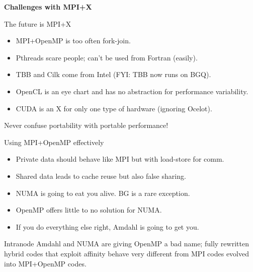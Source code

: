\begin{frame}{} \LARGE
  \begin{center}
      \textbf{Challenges with MPI+X}
  \end{center}
\end{frame}

\begin{frame}[fragile]{The future is MPI+X}
\begin{itemize}
	\item MPI+OpenMP is too often fork-join.
	\item Pthreads scare people; can't be used from Fortran (easily).
	\item TBB and Cilk come from Intel (FYI: TBB now runs on BGQ).
	\item OpenCL is an eye chart and has no abstraction for performance variability.
	\item CUDA is an X for only one type of hardware (ignoring Ocelot).
\end{itemize}
Never confuse portability with portable performance!
\end{frame}

\begin{frame}{Using MPI+OpenMP effectively} \large 
\begin{itemize}
	\item Private data should behave like MPI but with load-store for comm.
	\item Shared data leads to cache reuse but also false sharing.
	\item NUMA is going to eat you alive.  BG is a rare exception.
	\item OpenMP offers little to no solution for NUMA.
	\item If you do everything else right, Amdahl is going to get you.
\end{itemize}
Intranode Amdahl and NUMA are giving OpenMP a bad name;
fully rewritten hybrid codes that exploit affinity behave very different
from MPI codes evolved into MPI+OpenMP codes.
\end{frame}


